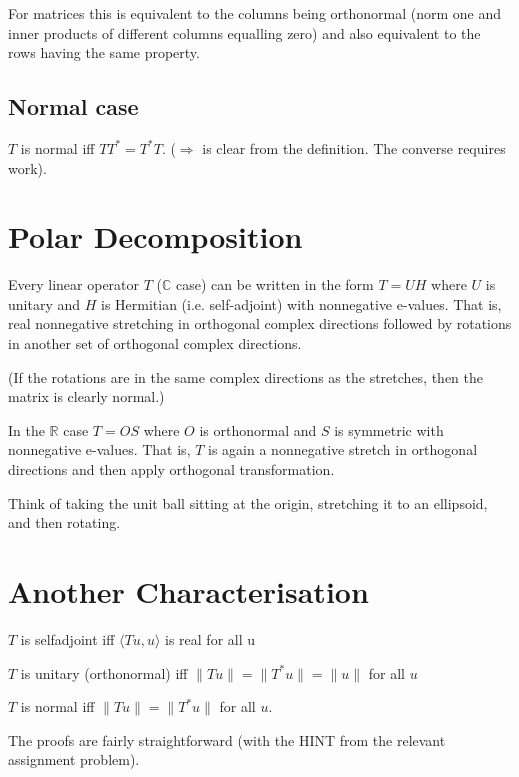\documentclass[a4paper]{amsart}
\theoremstyle{plain}
\theoremstyle{definition}
\theoremstyle{remark}
\begin{document}
For matrices this is equivalent to the columns being orthonormal (norm 
one and inner products of different columns equalling zero) and also equivalent to the rows having the same property. 

\subsection{Normal case} $ T$  is normal iff  $ T T^* = T^* T $. ($ \Longrightarrow$   is clear from the definition. The converse  requires work). 



\section{\textbf{Polar Decomposition}}

Every linear operator $ T$  ($ \mathbb{C} $  case) can be written in the form $ T = U H $ 
where $ U$  is unitary and $ H  $ is Hermitian (i.e. self-adjoint) with nonnegative 
e-values. That is, real nonnegative stretching in orthogonal complex directions 
followed by rotations in another set of orthogonal complex directions. 

(If the rotations are in the same complex directions as the stretches, then 
the matrix is clearly normal.) 

\medskip
 In the $ \mathbb{R} $  case $ T = OS$  where $ O$  is orthonormal and $ S$  is symmetric with 
nonnegative e-values. That is, $ T$  is again a nonnegative stretch in orthogonal directions and then apply orthogonal transformation. 

\medskip Think of taking the unit ball sitting at the origin, stretching it to an ellipsoid, 
and then rotating. 



\section{\textbf{Another Characterisation}}


 $ T$  is selfadjoint iff $ \langle T u, u\rangle $  is real for all u 

$ T $ is unitary (orthonormal) iff  $ \| T u\| = \|T^* u\| = \|u\| $  for all $ u $ 

$ T $ is normal iff  $ \|T u\| = \|T^* u\| $ for all $ u $.

\medskip The proofs are fairly straightforward (with the HINT from the relevant assignment problem). 
\end{document}
